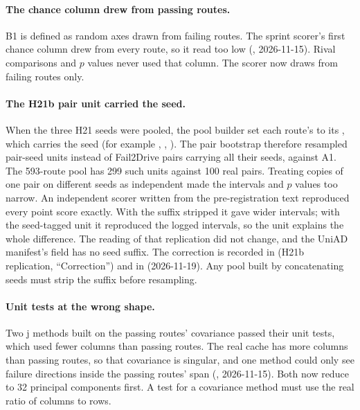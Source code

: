 \paragraph{The chance column drew from passing routes.}
B1 is defined as random axes drawn from failing routes. The sprint scorer's
first chance column drew from every route, so it read too low
(, 2026-11-15). Rival comparisons and $p$ values never used
that column. The scorer now draws from failing routes only.

\paragraph{The H21b pair unit carried the seed.}
\label{sec:h21b}
When the three H21 seeds were pooled, the pool builder set each route's
 to its , which carries the seed (for example
, , ). The pair bootstrap therefore
resampled pair-seed units instead of Fail2Drive pairs carrying all their seeds,
against A1.
The 593-route pool has 299 such units against 100 real pairs. Treating copies of
one pair on different seeds as independent made the intervals and $p$ values too
narrow. An independent scorer written from the pre-registration text reproduced
every point score exactly. With the suffix stripped it gave wider intervals;
with the seed-tagged unit it reproduced the logged intervals, so the unit
explains the whole difference. The reading of that replication did not change,
and the UniAD manifest's  field has no seed suffix. The correction is
recorded in  (H21b replication, ``Correction'') and in
 (2026-11-19). Any pool built by concatenating seeds must
strip the suffix before resampling.

\paragraph{Unit tests at the wrong shape.}
Two j methods built on the passing routes' covariance passed their unit tests,
which used fewer columns than passing routes. The real cache has more columns
than passing routes, so that covariance is singular, and one method could only
see failure directions inside the passing routes' span
(, 2026-11-15). Both now reduce to 32 principal components
first. A test for a covariance method must use the real ratio of columns to rows.

